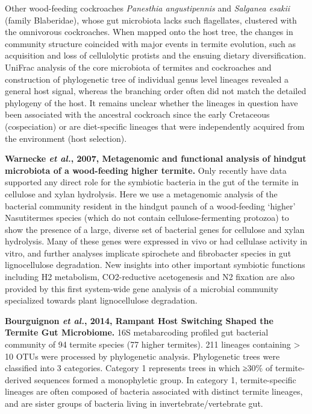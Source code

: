\documentclass[11pt]{article}
\begin{document}
\begin{sloppypar}
Other wood-feeding cockroaches \textit{Panesthia angustipennis} and \textit{Salganea esakii} (family Blaberidae), whose gut microbiota lacks such flagellates, clustered with the omnivorous cockroaches. 
When mapped onto the host tree, the changes in community structure coincided with major events in termite evolution, such as acquisition and loss of cellulolytic protists and the ensuing dietary diversification. 
UniFrac analysis of the core microbiota of termites and cockroaches and construction of phylogenetic tree of individual genus level lineages revealed a general host signal, whereas the branching order often did not match the detailed phylogeny of the host. 
It remains unclear whether the lineages in question have been associated with the ancestral cockroach since the early Cretaceous (cospeciation) or are diet-specific lineages that were independently acquired from the environment (host selection).
\par
\textbf{Warnecke \textit{et al.}, 2007, Metagenomic and functional analysis of hindgut microbiota of a wood-feeding higher termite.} \newline
Only recently have data supported any direct role for the symbiotic bacteria in the gut of the termite in cellulose and xylan hydrolysis. 
Here we use a metagenomic analysis of the bacterial community resident in the hindgut paunch of a wood-feeding ‘higher’ Nasutitermes species (which do not contain cellulose-fermenting protozoa) to show the presence of a large, diverse set of bacterial genes for cellulose and xylan hydrolysis. 
Many of these genes were expressed in vivo or had cellulase activity in vitro, and further analyses implicate spirochete and fibrobacter species in gut lignocellulose degradation. 
New insights into other important symbiotic functions including H2 metabolism, CO2-reductive acetogenesis and N2 fixation are also provided by this first system-wide gene analysis of a microbial community specialized towards plant lignocellulose degradation.
\par
\textbf{Bourguignon \textit{et al.}, 2014, Rampant Host Switching Shaped the Termite Gut Microbiome.} \newline
16S metabarcoding profiled gut bacterial community of 94 termite species (77 higher termites). 
211 lineages containing > 10 OTUs were processed by phylogenetic analysis. 
Phylogenetic trees were classified into 3 categories. 
Category 1 represents trees in which ≥30\% of termite-derived sequences formed a monophyletic group. 
In category 1, termite-specific lineages are often composed of bacteria associated with distinct termite lineages, and are sister groups of bacteria living in invertebrate/vertebrate gut. 

\end{sloppypar}
\end{document}
